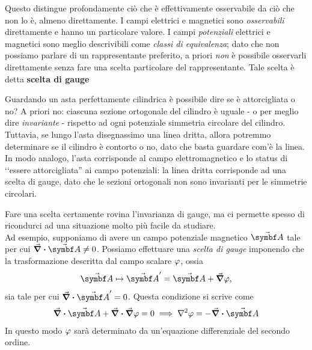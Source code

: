 Questo distingue profondamente ciò che è effettivamente osservabile da ciò che non lo è, almeno direttamente. I campi elettrici e magnetici sono \textit{osservabili} direttamente e hanno un particolare valore. I campi \textit{potenziali} elettrici e magnetici sono meglio descrivibili come \textit{classi di equivalenza}; dato che non possiamo parlare di un rappresentante preferito, a priori \textit{non} è possibile osservarli direttamente senza fare una scelta particolare del rappresentante. Tale scelta è detta \textbf{scelta di gauge}
\begin{intuit}
	Guardando un asta perfettamente cilindrica è possibile dire se è attorcigliata o no? A priori no: ciascuna sezione ortogonale del cilindro è uguale - o per meglio dire \textit{invariante} - rispetto ad ogni potenziale simmetria circolare del cilindro. Tuttavia, se lungo l'asta disegnassimo una linea dritta, allora potremmo determinare se il cilindro è contorto o no, dato che basta guardare com'è la linea.\\
	In modo analogo, l'asta corrisponde al campo elettromagnetico e lo status di ‘‘essere attorcigliata'' ai campo potenziali: la linea dritta corrisponde ad una scelta di gauge, dato che le sezioni ortogonali non sono invarianti per le simmetrie circolari.
\end{intuit}
\noindent Fare una scelta certamente rovina l'invarianza di gauge, ma ci permette spesso di ricondurci ad una situazione molto più facile da studiare.\\
Ad esempio, supponiamo di avere un campo potenziale magnetico $\vba{A}$ tale per cui $\div{\vba{A}}\neq 0$. Possiamo effettuare una \textit{scelta di gauge} imponendo che la trasformazione descritta dal campo scalare $\oldphi$, ossia
\begin{equation*}
	\vba{A}\mapsto\vba{A}'=\vba{A}+\grad{\oldphi},
\end{equation*}
sia tale per cui $\div{\vba{A}'}=0$. Questa condizione si scrive come
\begin{gather*}
	\div\vba{A}+\div\grad\oldphi=0 \implies \laplacian\oldphi= -\div\vba{A}
\end{gather*}
In questo modo $\oldphi$ sarà determinato da un'equazione differenziale del secondo ordine.

